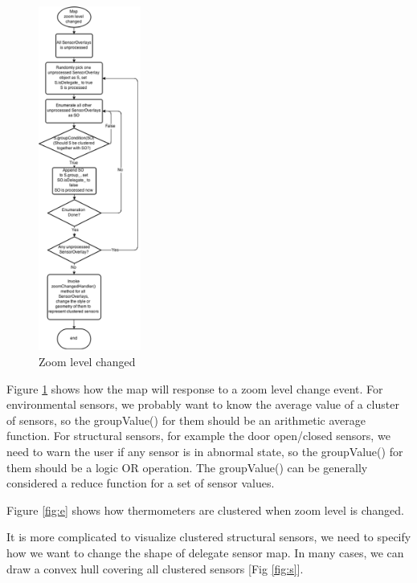 \documentclass{article}
\begin{document}
\begin{figure}
	\begin{flushright}
		\includegraphics[width=0.3\textwidth]{clustering.png}
	\end{flushright}
	\caption{Zoom level changed}
	\label{fig:clustering}
\end{figure}


Figure \ref{fig:clustering} shows how the map will response to a zoom level change event. For environmental sensors, we probably want to know the average value of a cluster of sensors, so the groupValue() for them should be an arithmetic average function. For structural sensors, for example the door open/closed sensors, we need to warn the user if any sensor is in abnormal state, so the groupValue() for them should be a logic OR operation. The groupValue() can be generally considered a reduce function for a set of sensor values.

Figure \ref{fig:e} shows how thermometers are clustered when zoom level is changed.

It is more complicated to visualize clustered structural sensors, we need to specify how we want to change the shape of delegate sensor map. In many cases, we can draw a convex hull covering all clustered sensors [Fig \ref{fig:s}].
\end{document}
